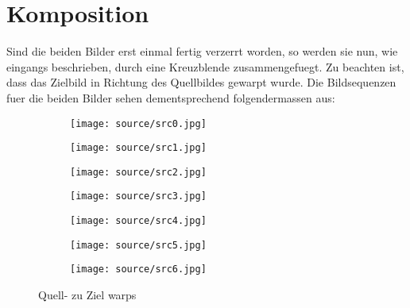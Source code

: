 \chapter{Komposition}

Sind die beiden Bilder erst einmal fertig verzerrt worden, so werden
sie nun, wie eingangs beschrieben, durch eine Kreuzblende 
zusammengefuegt. Zu beachten ist, dass das Zielbild
in Richtung des Quellbildes gewarpt wurde. Die Bildsequenzen
fuer die beiden Bilder sehen dementsprechend folgendermassen
aus:

\begin{figure}[htbp]
	\centering
    \begin{adjustbox}{margin=-20mm 0mm 0mm 0.2mm}

	
	\begin{subfigure}[b]{0.19\textwidth}
		\centering
		\texttt{[image: source/src0.jpg]} %
		\caption{}
	\end{subfigure}
		\begin{subfigure}[b]{0.19\textwidth}
		\centering
		\texttt{[image: source/src1.jpg]} %
		\caption{}
	\end{subfigure}
		\begin{subfigure}[b]{0.19\textwidth}
		\centering
		\texttt{[image: source/src2.jpg]} %
		\caption{}
	\end{subfigure}
		\begin{subfigure}[b]{0.19\textwidth}
		\centering
		\texttt{[image: source/src3.jpg]} %
		\caption{}
	\end{subfigure}
		\begin{subfigure}[b]{0.19\textwidth}
		\centering
		\texttt{[image: source/src4.jpg]} %
		\caption{}
	\end{subfigure}
		\begin{subfigure}[b]{0.19\textwidth}
		\centering
		\texttt{[image: source/src5.jpg]} %
		\caption{}
	\end{subfigure}
			\begin{subfigure}[b]{0.19\textwidth}
		\centering
		\texttt{[image: source/src6.jpg]} %
		\caption{}
	\end{subfigure}
	
	    \end{adjustbox}
	
		\caption{Quell- zu Ziel warps}
	\label{fig:sources}
	\end{figure}
	
